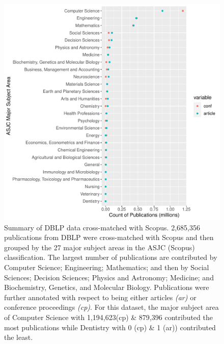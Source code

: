 \begin{figure}[ht]
\includegraphics[scale=0.75]{ar_cp_ratio.pdf}
\caption{Summary of DBLP data cross-matched with Scopus. 2,685,356 publications from DBLP were cross-matched with Scopus and then grouped by the 27 major subject areas in the ASJC (Scopus) classification. The largest number of publications are contributed by Computer Science; Engineering; Mathematics; and then by Social Sciences; Decision Sciences; Physics and Astronomy; Medicine; and Biochemistry, Genetics, and Molecular Biology. Publications were further annotated with respect to being either articles \emph{(ar)} or conference proceedings \emph{(cp)}. For this dataset, the major subject area of Computer Science with 1,194,623(cp) \& 879,396 contributed the most publications while Dentistry with 0 (cp) \& 1 (ar)) contributed the least.}
\label{fig:ar_cp_annotation}       %
\end{figure}

\newpage

